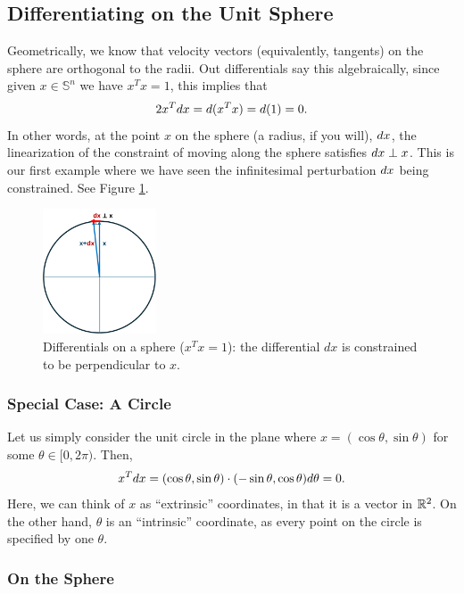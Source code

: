 \subsection{Differentiating on the Unit Sphere}

Geometrically, we know that velocity vectors (equivalently, tangents) on the sphere are orthogonal to the radii. Out differentials say this algebraically, since given $x\in \mathbb{S}^n$ we have $x^T x = 1$, this implies that 
\[
2x^T d x = d(x^T x) = d (1) = 0.
\]
In other words, at the point $x$ on the sphere (a radius, if you will), $d x$, the linearization of the constraint of moving along the sphere satisfies $d x \perp x$. This is our first example where we have seen the infinitesimal perturbation $d x$ being constrained. See Figure \ref{fig:tangentcircle}.

\begin{figure}[h]
    \centering
    \includegraphics[width=0.3\textwidth]
    {figures/tangent_to_radius.pdf}
    \caption{Differentials on a sphere ($x^T x = 1$): the differential $dx$ is constrained to be perpendicular to $x$.}
    \label{fig:tangentcircle}
\end{figure}

\subsubsection{Special Case: A Circle}

Let us simply consider the unit circle in the plane where $x = (\cos \theta, \sin \theta)$ for some $\theta \in [0,2\pi)$. Then, 
\[
x^T d x = (\cos \theta, \sin \theta) \cdot (-\sin \theta, \cos \theta) d\theta = 0.
\]
Here, we can think of $x$ as ``extrinsic'' coordinates, in that it is a vector in $\mathbb R^2$. On the other hand, $\theta$ is an ``intrinsic'' coordinate, as every point on the circle is specified by one $\theta$.

\subsubsection{On the Sphere}

